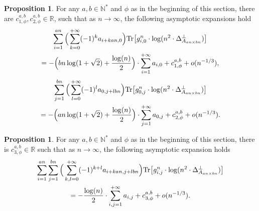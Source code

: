 \documentclass[12pt]{article}
\numberwithin{equation}{section}
\theoremstyle{theorem}
\theoremstyle{definition}
\newtheorem{prop}[thm]{Proposition}
\theoremstyle{remark}
\newcommand{\real}{\mathbb{R}}
\newcommand{\nat}{\mathbb{N}}
\newcommand{\laplcomp}{\Delta}
\newcommand{\tr}[1]{{\rm{Tr}} \big[ #1 \big]}
\begin{document}
		\begin{prop}\label{prop_trgi_first}
			For any $a, b \in \nat^*$ and $\phi$ as in the beginning of this section, there are $c_{1, \phi}^{a, b}, c_{2, \phi}^{a, b} \in \real$, such that as $n \to \infty$, the following asymptotic expansions hold
			\begin{multline}\label{eq_prop_trgi_first}
				\sum_{i = 1}^{an} \Big( \sum_{k = 0}^{+\infty} (-1)^k a_{i + kan, 0} \Big) \tr{g_{i, 0}^{n} \cdot \log (n^2 \cdot \laplcomp_{A_{an \times bn}}^{\perp})} 
				\\
				=
				-
				\Big(
					bn \log(1 + \sqrt{2})
					+
					\frac{\log(n)}{2}
				\Big)
				\cdot
				\sum_{i = 1}^{+\infty}		
				a_{i, 0}	
				+
				c_{1, \phi}^{a, b}
				+
				o(n^{-1/3}),
			\end{multline}
			\vspace*{-0.8cm}
			\begin{multline}\label{eq_prop_trgi_second}
				\sum_{j = 1}^{bn} \Big( \sum_{l = 0}^{+\infty} (-1)^l a_{0, j + lbn} \Big) \tr{g_{0, j}^{n} \cdot \log (n^2 \cdot \laplcomp_{A_{an \times bn}}^{\perp})} 
				\\
				=
				-
				\Big(
					an \log(1 + \sqrt{2})
					+
					\frac{\log(n)}{2}
				\Big)
				\cdot
				\sum_{j = 1}^{+\infty}		
				a_{0, j}	
				+
				c_{2, \phi}^{a, b}
				+
				o(n^{-1/3}).
			\end{multline}
		\end{prop}
		\begin{prop}\label{prop_trgi_second}
			For any $a, b \in \nat^*$ and $\phi$ as in the beginning of this section, there is $c_{3, \phi}^{a, b} \in \real$ such that as $n \to \infty$, the following asymptotic expansion holds
			\begin{multline}\label{eq_prop_gij_nonequ_easy}
				\sum_{i = 1}^{an} 
				\sum_{j = 1}^{bn} 
				\Big( \sum_{k, l = 0}^{+\infty} (-1)^{k + l} a_{i + kan, j + lbn} \Big) \tr{g_{i, j}^{n} \cdot \log (n^2 \cdot \laplcomp_{A_{an \times bn}}^{\perp})}
				\\
				=
				-\frac{\log(n)}{2}
				\cdot
				\sum_{i, j= 1}^{+\infty}		
				a_{i, j}	
				+
				c_{3, \phi}^{a, b}
				+
				o(n^{-1/3}).
			\end{multline}
		\end{prop}
\end{document}
